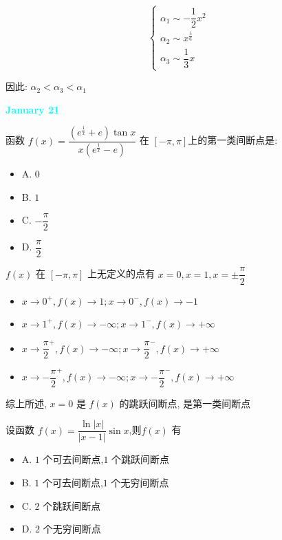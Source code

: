 \begin{solution}

	$$\begin{cases}
		\alpha_{1}\sim -\dfrac{1}{2}x^{2}\\
		\alpha_{2}\sim x^{\frac{5}{6}}\\
		\alpha_{3}\sim \dfrac{1}{3}x
	\end{cases}$$

	因此: $\alpha_{2} < \alpha_{3} < \alpha_{1}$
\end{solution}

\textcolor{cyan}{\textbf{January 21}}

\begin{example}[][Exam: 27.3.13]
	函数 $f(x)=\dfrac{(e^{\frac{1}{x}}+e)\tan x}{x(e^{\frac{1}{x}}-e)}$ 在 $[-\pi,\pi]$上的第一类间断点是:
\begin{itemize}
	\item A. $0$
	\item B. $1$
	\item C. $-\dfrac{\pi}{2}$
	\item D. $\dfrac{\pi}{2}$
\end{itemize}
\end{example}

\begin{solution}

	$f(x)$ 在 $[-\pi,\pi]$ 上无定义的点有 $x=0, x=1, x=\pm\dfrac{\pi}{2}$

	\begin{itemize}
		\item $x\to 0^{+}, f(x)\to 1 ; x\to 0^{-}, f(x)\to -1$
		\item $x\to 1^{+}, f(x)\to -\infty ; x\to 1^{-}, f(x)\to +\infty$
		\item $x\to \dfrac{\pi}{2}^{+}, f(x)\to -\infty ; x\to \dfrac{\pi}{2}^{-}, f(x)\to +\infty$
		\item $x\to -\dfrac{\pi}{2}^{+}, f(x)\to -\infty ; x\to -\dfrac{\pi}{2}^{-}, f(x)\to +\infty$
	\end{itemize}

	综上所述, $x=0$ 是 $f(x)$ 的跳跃间断点, 是第一类间断点
\end{solution}

\begin{example}[][Exam: 27.3.14]
	设函数 $f(x)=\dfrac{\ln|x|}{|x-1|}\sin x$,则$f(x)$ 有
\begin{itemize}
	\item A. $1$ 个可去间断点,$1$ 个跳跃间断点
	\item B. $1$ 个可去间断点,$1$ 个无穷间断点
	\item C. $2$ 个跳跃间断点
	\item D. $2$ 个无穷间断点
\end{itemize}
\end{example}

